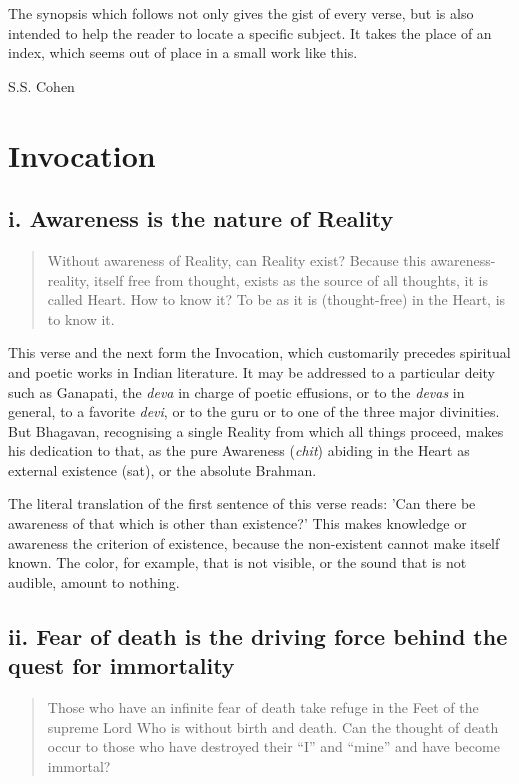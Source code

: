 \documentclass[12pt]{report}
\begin{document}
The synopsis which follows not only gives the gist of every verse, but
is also intended to help the reader to locate a specific subject. It
takes the place of an index, which seems out of place in a small work
like this.

S.S. Cohen

\chapter{Invocation}

\section*{i. Awareness is the nature of Reality}

\begin{quote}
Without awareness of Reality, can Reality exist? Because this
awareness-reality, itself free from thought, exists as the source of
all thoughts, it is called Heart. How to know it? To be as it is
(thought-free) in the Heart, is to know it.
\end{quote}

This verse and the next form the Invocation, which customarily
precedes spiritual and poetic works in Indian literature. It may be
addressed to a particular deity such as Ganapati, the \emph{deva} in
charge of poetic effusions, or to the \emph{devas} in general, to a
favorite \emph{devi}, or to the guru or to one of the three major
divinities. But Bhagavan, recognising a single Reality from which all
things proceed, makes his dedication to that, as the pure Awareness
(\emph{chit}) abiding in the Heart as external existence (sat), or the
absolute Brahman.

The literal translation of the first sentence of this verse reads:
'Can there be awareness of that which is other than existence?' This
makes knowledge or awareness the criterion of existence, because the
non-existent cannot make itself known. The color, for example, that is
not visible, or the sound that is not audible, amount to nothing.

\section*{ii. Fear of death is the driving force behind the quest for immortality}

\begin{quote}
  Those who have an infinite fear of death take refuge in the Feet of
  the supreme Lord Who is without birth and death. Can the thought of
  death occur to those who have destroyed their ``I'' and ``mine'' and
  have become immortal?
\end{quote}
\end{document}
